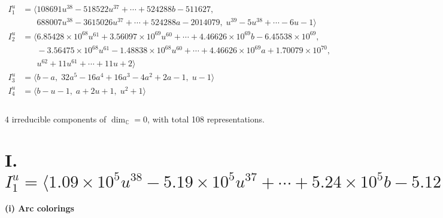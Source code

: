 \documentclass[1p]{elsarticle_modified}
\theoremstyle{definition}
\begin{document}
\begin{align*}
I^u_{1}&=\langle 
108691 u^{38}-518522 u^{37}+\cdots+524288 b-511627,\\
\phantom{I^u_{1}}&\phantom{= \langle  }688007 u^{38}-3615026 u^{37}+\cdots+524288 a-2014079,\;u^{39}-5 u^{38}+\cdots-6 u-1\rangle \\
I^u_{2}&=\langle 
6.85428\times10^{68} u^{61}+3.56097\times10^{69} u^{60}+\cdots+4.46626\times10^{69} b-6.45538\times10^{69},\\
\phantom{I^u_{2}}&\phantom{= \langle  }-3.56475\times10^{68} u^{61}-1.48838\times10^{68} u^{60}+\cdots+4.46626\times10^{69} a+1.70079\times10^{70},\\
\phantom{I^u_{2}}&\phantom{= \langle  }u^{62}+11 u^{61}+\cdots+11 u+2\rangle \\
I^u_{3}&=\langle 
b- a,\;32 a^5-16 a^4+16 a^3-4 a^2+2 a-1,\;u-1\rangle \\
I^u_{4}&=\langle 
b- u-1,\;a+2 u+1,\;u^2+1\rangle \\
\\
\end{align*}
\raggedright * 4 irreducible components of $\dim_{\mathbb{C}}=0$, with total 108 representations.\\
\newpage
\renewcommand{\arraystretch}{1}
\centering \section*{I. $I^u_{1}= \langle 1.09\times10^{5} u^{38}-5.19\times10^{5} u^{37}+\cdots+5.24\times10^{5} b-5.12\times10^{5},\;6.88\times10^{5} u^{38}-3.62\times10^{6} u^{37}+\cdots+5.24\times10^{5} a-2.01\times10^{6},\;u^{39}-5 u^{38}+\cdots-6 u-1 \rangle$}
\flushleft \textbf{(i) Arc colorings}\\
\end{document}
